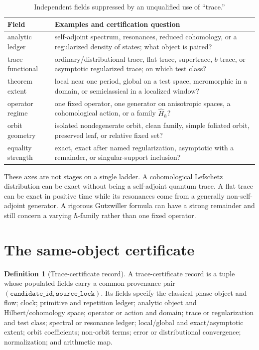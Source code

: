 \documentclass[11pt]{article}
\theoremstyle{definition}
\newtheorem{definition}[theorem]{Definition}
\theoremstyle{remark}
\begin{document}
\begin{table}[ht]
\centering
\caption{Independent fields suppressed by an unqualified use of ``trace.''}
\label{tab:types}
\small
\begin{tabularx}{\textwidth}{p{}X}
\toprule
Field & Examples and certification question\\
\midrule
analytic ledger & self-adjoint spectrum, resonances, reduced cohomology, or a regularized density of states; what object is paired?\\
trace functional & ordinary/distributional trace, flat trace, supertrace, \(b\)-trace, or asymptotic regularized trace; on which test class?\\
theorem extent & local near one period, global on a test space, meromorphic in a domain, or semiclassical in a localized window?\\
operator regime & one fixed operator, one generator on anisotropic spaces, a cohomological action, or a family \(\widehat H_\hbar\)?\\
orbit geometry & isolated nondegenerate orbit, clean family, simple foliated orbit, preserved leaf, or relative fixed set?\\
equality strength & exact, exact after named regularization, asymptotic with a remainder, or singular-support inclusion?\\
\bottomrule
\end{tabularx}
\end{table}

These axes are not stages on a single ladder.  A cohomological Lefschetz
distribution can be exact without being a self-adjoint quantum trace.  A flat
trace can be exact in positive time while its resonances come from a generally
non-self-adjoint generator.  A rigorous Gutzwiller formula can have a strong
remainder and still concern a varying \(\hbar\)-family rather than one fixed
operator.

\section{The same-object certificate}
\label{sec:certificate}

\begin{definition}[Trace-certificate record]
A trace-certificate record is a tuple whose populated fields carry a common
provenance pair \((\texttt{candidate\_id},\texttt{source\_lock})\).  Its fields
specify the classical phase object and flow; clock; primitive and repetition
ledger; analytic object and Hilbert/cohomology space; operator or action and
domain; trace or regularization and test class; spectral or resonance ledger;
local/global and exact/asymptotic extent; orbit coefficients; non-orbit terms;
error or distributional convergence; normalization; and arithmetic map.
\end{definition}
\end{document}
